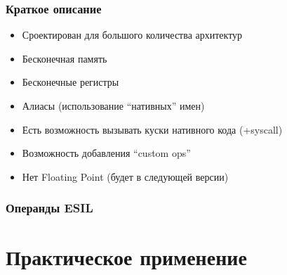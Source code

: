 \documentclass[10pt,pdf,utf8,english,compress,hyperref={unicode}]{beamer}
\begin{document}
\begin{frame}[fragile]
  \frametitle{Краткое описание}
     \begin{itemize}
        \item Сроектирован для большого количества архитектур
		\item Бесконечная память
		\item Бесконечные регистры
		\item Алиасы (использование ``нативных'' имен)
		\item Есть возможность вызывать куски нативного кода (+syscall)
		\item Возможность добавления ``custom ops''
		\item Нет Floating Point (будет в следующей версии)
      \end{itemize}
\end{frame}

\begin{frame}[fragile]
  \frametitle{Операнды ESIL}
    \begin{table}[H]
	\caption{ESIL Operands }
	\begin{center}
	\end{center}
	\end{table}
\end{frame}

\section{Практическое применение}
\end{document}
